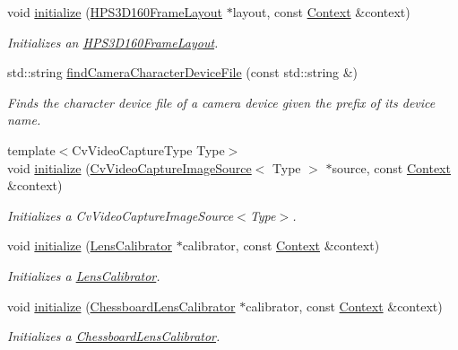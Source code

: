 \begin{DoxyCompactItemize}
void \hyperlink{namespacestereo__ugv_ac02cc03581ba53b911a9a7bd87f9a24c}{initialize} (\hyperlink{classstereo__ugv_1_1HPS3D160FrameLayout}{H\+P\+S3\+D160\+Frame\+Layout} $\ast$layout, const \hyperlink{classstereo__ugv_1_1Context}{Context} \&context)
\begin{DoxyCompactList}\small\item\em Initializes an \hyperlink{classstereo__ugv_1_1HPS3D160FrameLayout}{H\+P\+S3\+D160\+Frame\+Layout}. \end{DoxyCompactList}\item 
std\+::string \hyperlink{namespacestereo__ugv_af45c67058883fb26e2c27945af6ab490}{find\+Camera\+Character\+Device\+File} (const std\+::string \&)
\begin{DoxyCompactList}\small\item\em Finds the character device file of a camera device given the prefix of its device name. \end{DoxyCompactList}\item 
{\footnotesize template$<$Cv\+Video\+Capture\+Type Type$>$ }\\void \hyperlink{namespacestereo__ugv_acaec0936792769b5d676773f7d4070cd}{initialize} (\hyperlink{classstereo__ugv_1_1CvVideoCaptureImageSource}{Cv\+Video\+Capture\+Image\+Source}$<$ Type $>$ $\ast$source, const \hyperlink{classstereo__ugv_1_1Context}{Context} \&context)
\begin{DoxyCompactList}\small\item\em Initializes a Cv\+Video\+Capture\+Image\+Source$<$\+Type$>$. \end{DoxyCompactList}\item 
void \hyperlink{namespacestereo__ugv_aab7c44a98ba3f61baec2e4c1c9802bee}{initialize} (\hyperlink{classstereo__ugv_1_1LensCalibrator}{Lens\+Calibrator} $\ast$calibrator, const \hyperlink{classstereo__ugv_1_1Context}{Context} \&context)
\begin{DoxyCompactList}\small\item\em Initializes a \hyperlink{classstereo__ugv_1_1LensCalibrator}{Lens\+Calibrator}. \end{DoxyCompactList}\item 
void \hyperlink{namespacestereo__ugv_a8e8ff522fb8d2300fcdfc02ab0025e98}{initialize} (\hyperlink{classstereo__ugv_1_1ChessboardLensCalibrator}{Chessboard\+Lens\+Calibrator} $\ast$calibrator, const \hyperlink{classstereo__ugv_1_1Context}{Context} \&context)
\begin{DoxyCompactList}\small\item\em Initializes a \hyperlink{classstereo__ugv_1_1ChessboardLensCalibrator}{Chessboard\+Lens\+Calibrator}. \end{DoxyCompactList}\end{DoxyCompactItemize}


